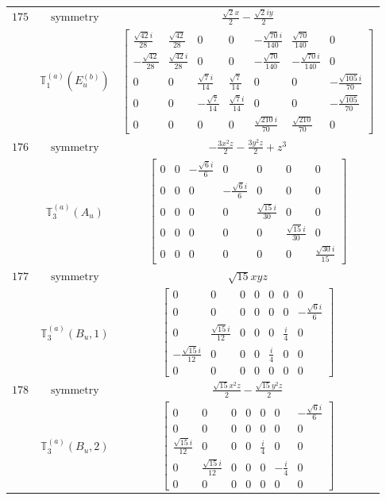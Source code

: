 \documentclass[fleqn,8pt,landscape]{jsarticle}
\begin{document}
\begin{longtable}{ccc}
$ 175 $ & $ \text{symmetry} $ & $ \frac{\sqrt{2} x}{2} - \frac{\sqrt{2} i y}{2} $ \\
$  $ & $ \mathbb{T}_{1}^{(a)}(E_{u}^{(b)}) $ & $ \begin{bmatrix} \frac{\sqrt{42} i}{28} & \frac{\sqrt{42}}{28} & 0 & 0 & - \frac{\sqrt{70} i}{140} & \frac{\sqrt{70}}{140} & 0 \\ - \frac{\sqrt{42}}{28} & \frac{\sqrt{42} i}{28} & 0 & 0 & - \frac{\sqrt{70}}{140} & - \frac{\sqrt{70} i}{140} & 0 \\ 0 & 0 & \frac{\sqrt{7} i}{14} & \frac{\sqrt{7}}{14} & 0 & 0 & - \frac{\sqrt{105} i}{70} \\ 0 & 0 & - \frac{\sqrt{7}}{14} & \frac{\sqrt{7} i}{14} & 0 & 0 & - \frac{\sqrt{105}}{70} \\ 0 & 0 & 0 & 0 & \frac{\sqrt{210} i}{70} & \frac{\sqrt{210}}{70} & 0 \end{bmatrix} $ \\ \hline
$ 176 $ & $ \text{symmetry} $ & $ - \frac{3 x^{2} z}{2} - \frac{3 y^{2} z}{2} + z^{3} $ \\
$  $ & $ \mathbb{T}_{3}^{(a)}(A_{u}) $ & $ \begin{bmatrix} 0 & 0 & - \frac{\sqrt{6} i}{6} & 0 & 0 & 0 & 0 \\ 0 & 0 & 0 & - \frac{\sqrt{6} i}{6} & 0 & 0 & 0 \\ 0 & 0 & 0 & 0 & \frac{\sqrt{15} i}{30} & 0 & 0 \\ 0 & 0 & 0 & 0 & 0 & \frac{\sqrt{15} i}{30} & 0 \\ 0 & 0 & 0 & 0 & 0 & 0 & \frac{\sqrt{30} i}{15} \end{bmatrix} $ \\ \hline
$ 177 $ & $ \text{symmetry} $ & $ \sqrt{15} x y z $ \\
$  $ & $ \mathbb{T}_{3}^{(a)}(B_{u},1) $ & $ \begin{bmatrix} 0 & 0 & 0 & 0 & 0 & 0 & 0 \\ 0 & 0 & 0 & 0 & 0 & 0 & - \frac{\sqrt{6} i}{6} \\ 0 & \frac{\sqrt{15} i}{12} & 0 & 0 & 0 & \frac{i}{4} & 0 \\ - \frac{\sqrt{15} i}{12} & 0 & 0 & 0 & \frac{i}{4} & 0 & 0 \\ 0 & 0 & 0 & 0 & 0 & 0 & 0 \end{bmatrix} $ \\ \hline
$ 178 $ & $ \text{symmetry} $ & $ \frac{\sqrt{15} x^{2} z}{2} - \frac{\sqrt{15} y^{2} z}{2} $ \\
$  $ & $ \mathbb{T}_{3}^{(a)}(B_{u},2) $ & $ \begin{bmatrix} 0 & 0 & 0 & 0 & 0 & 0 & - \frac{\sqrt{6} i}{6} \\ 0 & 0 & 0 & 0 & 0 & 0 & 0 \\ \frac{\sqrt{15} i}{12} & 0 & 0 & 0 & \frac{i}{4} & 0 & 0 \\ 0 & \frac{\sqrt{15} i}{12} & 0 & 0 & 0 & - \frac{i}{4} & 0 \\ 0 & 0 & 0 & 0 & 0 & 0 & 0 \end{bmatrix} $ \\ \hline

\end{longtable}
\end{document}
